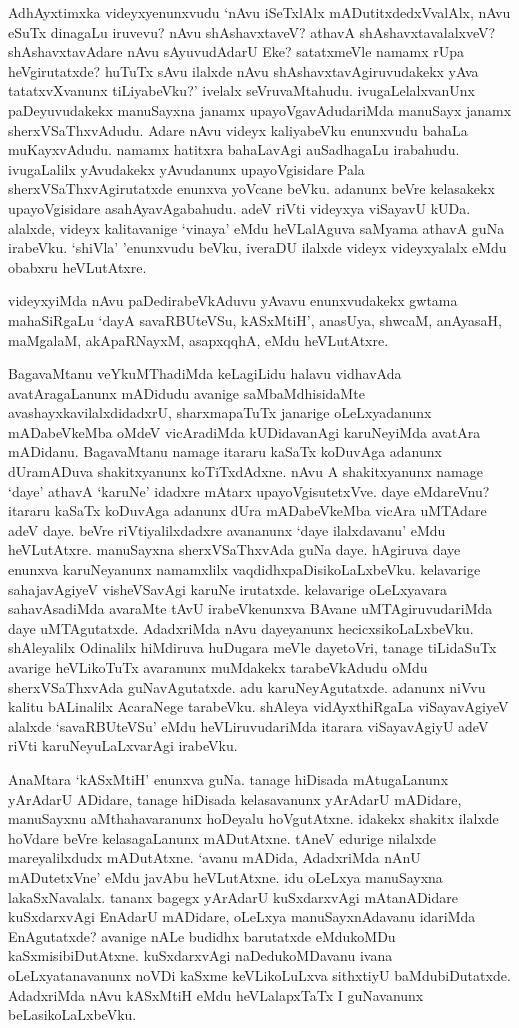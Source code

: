 AdhAyxtimxka videyxyenunxvudu `nAvu iSeTxlAlx mADutitxdedxVvalAlx, nAvu eSuTx dinagaLu iruvevu? nAvu shAshavxtaveV? athavA shAshavxtavalalxveV? shAshavxtavAdare 
nAvu sAyuvudAdarU Eke? satatxmeVle namamx rUpa heVgirutatxde? huTuTx sAvu ilalxde nAvu shAshavxtavAgiruvudakekx yAva 
tatatxvXvanunx tiLiyabeVku?' ivelalx seVruvaMtahudu. ivugaLelalxvanUnx paDeyuvudakekx manuSayxna janamx upayoVgavAdudariMda manuSayx 
janamx sherxVSaThxvAdudu. Adare nAvu videyx kaliyabeVku enunxvudu bahaLa muKayxvAdudu. namamx hatitxra bahaLavAgi auSadhagaLu irabahudu. 
ivugaLalilx yAvudakekx yAvudanunx upayoVgisidare Pala sherxVSaThxvAgirutatxde enunxva yoVcane beVku. adanunx beVre kelasakekx upayoVgisidare 
asahAyavAgabahudu. adeV riVti videyxya viSayavU kUDa. alalxde, videyx kalitavanige `vinaya' eMdu heVLalAguva saMyama athavA 
guNa irabeVku. `shiVla' 'enunxvudu beVku, iveraDU ilalxde videyx videyxyalalx eMdu obabxru heVLutAtxre.

videyxyiMda nAvu paDedirabeVkAduvu yAvavu enunxvudakekx gwtama mahaSiRgaLu `dayA savaRBUteVSu, kASxMtiH', anasUya, shwcaM, 
anAyasaH, maMgalaM, akApaRNayxM, asapxqqhA, eMdu heVLutAtxre.

BagavaMtanu veYkuMThadiMda keLagiLidu halavu vidhavAda avatAragaLanunx mADidudu avanige saMbaMdhisidaMte avashayxkavilalxdidadxrU, sharxmapaTuTx janarige 
oLeLxyadanunx mADabeVkeMba oMdeV vicAradiMda kUDidavanAgi karuNeyiMda avatAra mADidanu. BagavaMtanu namage itararu kaSaTx 
koDuvAga adanunx dUramADuva shakitxyanunx koTiTxdAdxne. nAvu A shakitxyanunx namage `daye' athavA `karuNe' idadxre mAtarx upayoVgisutetxVve. daye 
eMdareVnu? itararu kaSaTx koDuvAga adanunx dUra mADabeVkeMba vicAra uMTAdare adeV daye. beVre riVtiyalilxdadxre avananunx `daye ilalxdavanu' eMdu 
heVLutAtxre. manuSayxna sherxVSaThxvAda guNa daye. hAgiruva daye enunxva karuNeyanunx namamxlilx vaqdidhxpaDisikoLaLxbeVku. kelavarige sahajavAgiyeV 
visheVSavAgi karuNe irutatxde. kelavarige oLeLxyavara sahavAsadiMda avaraMte tAvU irabeVkenunxva BAvane uMTAgiruvudariMda daye 
uMTAgutatxde. AdadxriMda nAvu dayeyanunx hecicxsikoLaLxbeVku. shAleyalilx Odinalilx hiMdiruva huDugara meVle dayetoVri, tanage tiLidaSuTx 
avarige heVLikoTuTx avaranunx muMdakekx tarabeVkAdudu oMdu sherxVSaThxvAda guNavAgutatxde. adu karuNeyAgutatxde. adanunx niVvu kalitu bALinalilx 
AcaraNege tarabeVku. shAleya vidAyxthiRgaLa viSayavAgiyeV alalxde `savaRBUteVSu' eMdu heVLiruvudariMda itarara viSayavAgiyU adeV riVti karuNeyuLaLxvarAgi irabeVku. 

AnaMtara `kASxMtiH' enunxva guNa. tanage hiDisada mAtugaLanunx yArAdarU ADidare, tanage hiDisada kelasavanunx yArAdarU 
mADidare, manuSayxnu aMthahavaranunx hoDeyalu hoVgutAtxne. idakekx shakitx ilalxde hoVdare beVre kelasagaLanunx mADutAtxne. 
tAneV edurige nilalxde mareyalilxdudx mADutAtxne. `avanu mADida, AdadxriMda nAnU mADutetxVne' eMdu javAbu heVLutAtxne. idu oLeLxya 
manuSayxna lakaSxNavalalx. tananx bagegx yArAdarU kuSxdarxvAgi mAtanADidare kuSxdarxvAgi EnAdarU mADidare, oLeLxya manuSayxnAdavanu idariMda 
EnAgutatxde? avanige nALe budidhx barutatxde eMdukoMDu kaSxmisibiDutAtxne. kuSxdarxvAgi naDedukoMDavanu ivana oLeLxyatanavanunx noVDi 
kaSxme keVLikoLuLxva sithxtiyU baMdubiDutatxde. AdadxriMda nAvu kASxMtiH eMdu heVLalapxTaTx I guNavanunx beLasikoLaLxbeVku.

